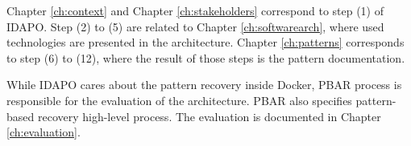Chapter \ref{ch:context} and Chapter \ref{ch:stakeholders} correspond to step
(1) of IDAPO. Step (2) to (5) are related to Chapter \ref{ch:softwarearch},
where used technologies are presented in the architecture. Chapter
\ref{ch:patterns} corresponds to step (6) to (12), where the result of those
steps is the pattern documentation.

While IDAPO cares about the pattern recovery inside Docker, PBAR process is
responsible for the evaluation of the architecture. PBAR also specifies pattern-
based recovery high-level process. The evaluation is documented in Chapter
\ref{ch:evaluation}.

